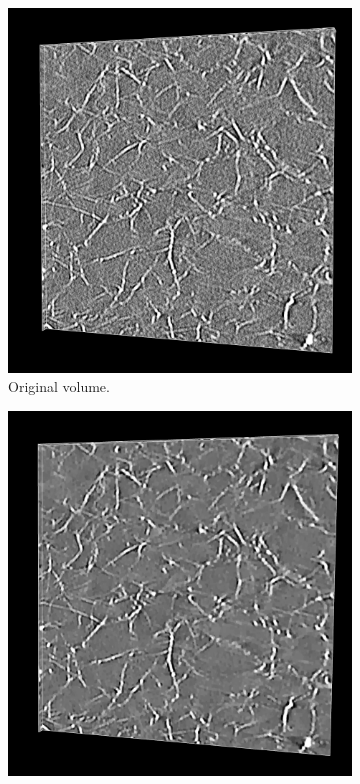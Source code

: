 \begin{figure}[H]
  \centering
  \begin{subfigure}{0.5\textwidth}
    \centering
    \includegraphics[width=0.9\linewidth]{Figures/chapter-image/pipeline_screenshots/carra_original_tile1.png}
    \caption{Original volume.}
    \label{fig:carra_original}
  \end{subfigure}%
  \begin{subfigure}{0.5\textwidth}
    \centering
    \includegraphics[width=0.9\linewidth]{Figures/chapter-image/pipeline_screenshots/carra_denoised_tv20_tile1.png}

\end{subfigure}
\end{figure}

